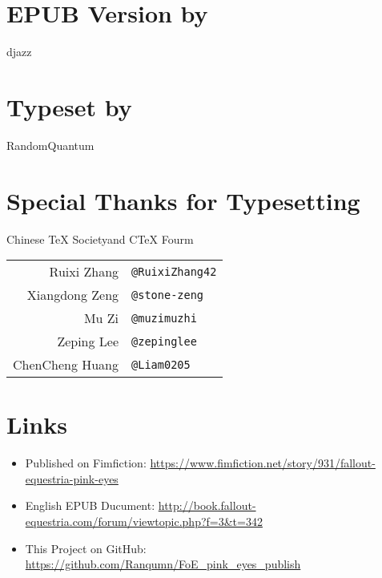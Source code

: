{\section*{EPUB Version by}

\begin{center}
    djazz
\end{center}

\section*{Typeset by}

\begin{center}
    RandomQuantum
\end{center}

\section*{Special Thanks for Typesetting}

\begin{table}[H]
    \centering
    
    \begin{center}
    Chinese \TeX{} Society\footnotemark and C\TeX{} Fourm\footnotemark
    \end{center}
  
    \begin{tabular}{rl}
        Ruixi Zhang & \texttt{@RuixiZhang42} \\
        Xiangdong Zeng & \texttt{@stone-zeng} \\
        Mu Zi & \texttt{@muzimuzhi} \\
        Zeping Lee & \texttt{@zepinglee} \\
        ChenCheng Huang & \texttt{@Liam0205} \\
    \end{tabular}
\end{table}

\addtocounter{footnote}{-2} %



\section*{Links}

\begin{itemize}
    \item Published on Fimfiction: \url{https://www.fimfiction.net/story/931/fallout-equestria-pink-eyes}
    \item English EPUB Ducument: \url{http://book.fallout-equestria.com/forum/viewtopic.php?f=3\&t=342}
    \item This Project on GitHub: \url{https://github.com/Ranqumn/FoE_pink_eyes_publish}
\end{itemize}

}

